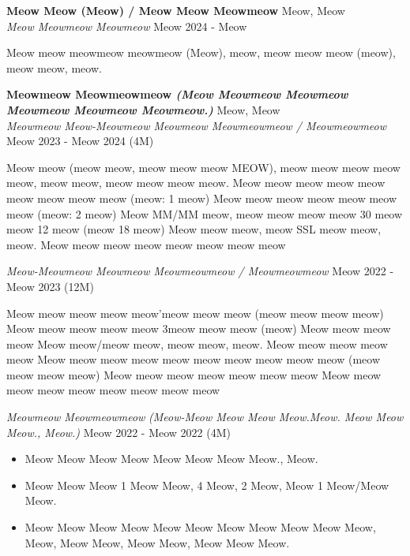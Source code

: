 \textbf{Meow Meow (Meow) / Meow Meow Meowmeow} \hfill Meow, Meow\\
\textit{Meow Meowmeow Meowmeow} \hfill Meow 2024 - Meow\\
\vspace{-1mm}
\begin{outline}
	\1 Meow meow meowmeow meowmeow (Meow), meow, meow meow meow (meow), meow meow, meow.
\end{outline}
\vspace{-1mm}
\textbf{Meowmeow Meowmeowmeow \textit{\tiny{(Meow Meowmeow Meowmeow Meowmeow Meowmeow Meowmeow.)}}} \hfill Meow, Meow\\
\textit{Meowmeow Meow-Meowmeow Meowmeow Meowmeowmeow / Meowmeowmeow} \hfill Meow 2023 - Meow 2024 (4M)\\
\vspace{-1mm}
\begin{outline}
	\1 Meow meow (meow meow, meow meow meow MEOW), meow meow meow meow meow, meow meow, meow meow meow meow.
	\1 Meow meow meow meow meow meow meow meow meow (meow: 1 meow)
	\1 Meow meow meow meow meow meow meow (meow: 2 meow)
	\1 Meow MM/MM meow, meow meow meow meow 30 meow meow 12 meow (meow 18 meow)
	\1 Meow meow meow, meow SSL meow meow, meow.
	\1 Meow meow meow meow meow meow meow meow
\end{outline}
\vspace{-1mm}
\textit{Meow-Meowmeow Meowmeow Meowmeowmeow / Meowmeowmeow} \hfill Meow 2022 - Meow 2023 (12M)\\
\vspace{-1mm}
\begin{outline}
	\1 Meow meow meow meow meow'meow meow meow (meow meow meow meow)
		\2 Meow meow meow meow meow 3meow meow meow (meow)
		\2 Meow meow meow meow
		\2 Meow meow/meow meow, meow meow, meow.
	\1 Meow meow meow meow meow
		\2 Meow meow meow meow meow meow meow meow meow meow (meow meow meow meow)
		\2 Meow meow meow meow meow meow meow
		\2 Meow meow meow meow meow meow meow meow meow
\end{outline}
\vspace{-1mm}
\textit{Meowmeow Meowmeowmeow} \textit{\tiny (Meow-Meow Meow Meow Meow.Meow. Meow Meow Meow., Meow.)} \hfill Meow 2022 - Meow 2022 (4M)\\
\vspace{-1mm}
\begin{itemize}
	\item Meow Meow Meow Meow Meow Meow Meow Meow., Meow.
	\item Meow Meow Meow 1 Meow Meow, 4 Meow, 2 Meow, Meow 1 Meow/Meow Meow.
	\item Meow Meow Meow Meow Meow Meow Meow Meow Meow Meow Meow, Meow, Meow Meow, Meow Meow, Meow Meow Meow.
\end{itemize}
